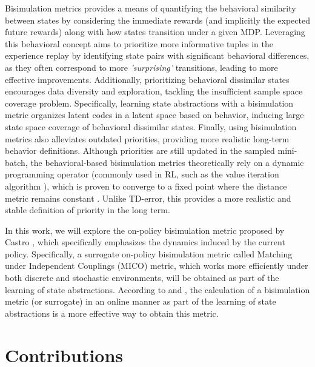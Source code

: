 Bisimulation metrics \cite{ferns2004metrics, ferns2011bisimulation, ferns2014bisimulation, castro2020scalable} provides a means of quantifying the behavioral similarity between states by considering the immediate rewards (and implicitly the expected future rewards) along with how states transition under a given MDP. Leveraging this behavioral concept aims to prioritize more informative tuples in the experience replay by identifying state pairs with significant behavioral differences, as they often correspond to more \textit{'surprising'} transitions, leading to more effective improvements. Additionally, prioritizing behavioral dissimilar states encourages data diversity and exploration, tackling the insufficient sample space coverage problem. Specifically, learning state abstractions with a bisimulation metric organizes latent codes in a latent space based on behavior, inducing large state space coverage of behavioral dissimilar states. Finally, using bisimulation metrics also alleviates outdated priorities, providing more realistic long-term behavior definitions. Although priorities are still updated in the sampled mini-batch, the behavioral-based bisimulation metrics theoretically rely on a dynamic programming operator (commonly used in RL, such as the value iteration algorithm \cite{sutton2018reinforcement}), which is proven to converge to a fixed point where the distance metric remains constant \cite{castro2020scalable, castro2021mico}. Unlike TD-error, this provides a more realistic and stable definition of priority in the long term.

In this work, we will explore the on-policy bisimulation metric proposed by Castro \cite{castro2020scalable}, which specifically emphasizes the dynamics induced by the current policy. Specifically, a surrogate on-policy bisimulation metric called Matching under Independent Couplings (MICO) \cite{castro2021mico} metric, which works more efficiently under both discrete and stochastic environments, will be obtained as part of the learning of state abstractions. According to \cite{zhang2020learning} and \cite{castro2021mico}, the calculation of a bisimulation metric (or surrogate) in an online manner as part of the learning of state abstractions is a more effective way to obtain this metric.

\section{Contributions}

